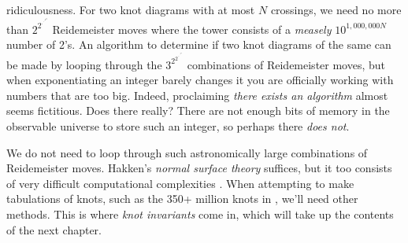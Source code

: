     ridiculousness. For two knot diagrams with at most $N$ crossings, we need
    no more than $2^{2^{\cdot^{\cdot^{\cdot^{{2^{N}}}}}}}$ Reidemeister moves
    where the tower consists of a \textit{measely}
    $10^{1,000,000N}$ number of 2's. An algorithm to determine if two knot
    diagrams of the same can be made by looping through the
    $3^{2^{2^{\cdot^{\cdot^{\cdot^{{2^{N}}}}}}}}$ combinations of Reidemeister
    moves, but when exponentiating an integer barely changes it
    you are officially working with numbers that are too big. Indeed,
    proclaiming \textit{there exists an algorithm} almost seems fictitious.
    Does there really? There are not enough bits of memory in the observable
    universe to store such an integer, so perhaps there \textit{does not}.
    \par\hfill\par
    We do not need to loop through such astronomically large combinations of
    Reidemeister moves. Hakken's \textit{normal surface theory} suffices,
    but it too consists of very difficult computational complexities
    \cite{HASS1998569}. When attempting to make tabulations of knots,
    such as the 350+ million knots in \cite{Burton2020TheN3}, we'll need
    other methods. This is where \textit{knot invariants} come in, which will
    take up the contents of the next chapter.
